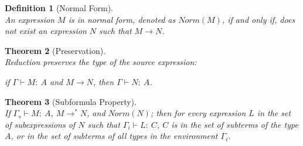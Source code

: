 \documentclass[11p,a4paper]{article}
\newcommand{\typecolor}{}
\newcommand{\termcolor}{}
\newcommand{\tp}[1]{{\typecolor #1}}
\newcommand{\tm}[1]{{\termcolor #1}}
\newtheorem{theorem}{Theorem}
\newtheorem{definition}[theorem]{Definition}
\newcommand{\env}{\tp{\Gamma}}
\newcommand{\typing}[2]{\tm{#1:\ }\tp{#2}}
\newcommand{\reduce}[2]{#1 \longrightarrow^* #2}
\begin{document}
\begin{definition}[Normal Form]\ \\
An expression $M$ is in normal form, denoted as $Norm(M)$, if and only
if, does not exist an expression $N$ such that $M \longrightarrow
N$.
\end{definition}

\begin{theorem}[Preservation]\ \\
Reduction preserves the type of the source expression:
 
 if $\env \vdash \typing{M}{A}$ and $M \longrightarrow N$, then 
$\env \vdash \typing{N}{A}$.
\end{theorem}

\begin{theorem}[Subformula Property]\ \\
If $\Gamma_s \vdash \typing{M}{A}$, $\reduce{M}{N}$, and $Norm(N)$;
then for every expression $L$ in the set of subexpressions of $N$ such
that $\Gamma_i \vdash \typing{L}{C}$, $C$ is in the set of subterms of
the type $A$, or in the set of subterms of all types in the
environment $\Gamma_i$.
\end{theorem}
 
\end{document}
